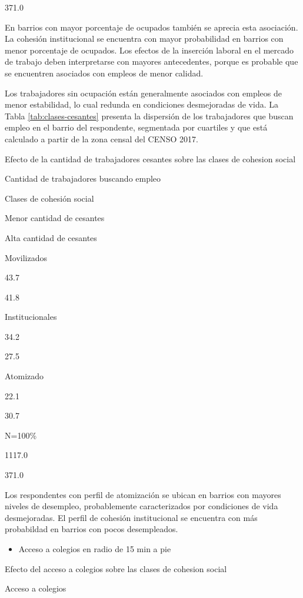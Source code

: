 \documentclass[
  12pt,
]{book}
\providecommand{\tightlist}{%
  \setlength{\itemsep}{0pt}\setlength{\parskip}{0pt}}
\begin{document}
371.0

En barrios con mayor porcentaje de ocupados también se aprecia esta asociación. La cohesión institucional se encuentra con mayor probabilidad en barrios con menor porcentaje de ocupados. Los efectos de la inserción laboral en el mercado de trabajo deben interpretarse con mayores antecedentes, porque es probable que se encuentren asociados con empleos de menor calidad.

Los trabajadores sin ocupación están generalmente asociados con empleos de menor estabilidad, lo cual redunda en condiciones desmejoradas de vida. La Tabla \ref{tab:clases-cesantes} presenta la dispersión de los trabajadores que buscan empleo en el barrio del respondente, segmentada por cuartiles y que está calculado a partir de la zona censal del CENSO 2017.

\label{tab:clases-cesantes}Efecto de la cantidad de trabajadores cesantes sobre las clases de cohesion social

Cantidad de trabajadores buscando empleo

Clases de cohesión social

Menor cantidad de cesantes

Alta cantidad de cesantes

Movilizados

43.7

41.8

Institucionales

34.2

27.5

Atomizado

22.1

30.7

N=100\%

1117.0

371.0

Los respondentes con perfil de atomización se ubican en barrios con mayores niveles de desempleo, probablemente caracterizados por condiciones de vida desmejoradas. El perfil de cohesión institucional se encuentra con más probabildad en barrios con pocos desempleados.

\begin{itemize}
\tightlist
\item
  Acceso a colegios en radio de 15 min a pie
\end{itemize}

\label{tab:clases-acced}Efecto del acceso a colegios sobre las clases de cohesion social

Acceso a colegios
\end{document}
